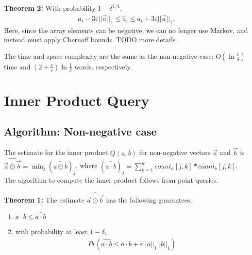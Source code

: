 \documentclass[11pt]{article}
\begin{document}
\textbf{Theorem 2:} With probability $1 - \delta^{1/4}$,
\begin{align}
    a_i - 3\varepsilon||\vec{a}||_1 \leq \hat{a}_i \leq a_i + 3\varepsilon||\vec{a}||_1. 
\end{align}
Here, since the array elements can be negative, we can no longer use Markov, and instead must apply Chernoff
bounds. TODO more details

The time and space complexity are the same as the non-negative case: $O(\ln
\frac{1}{\delta})$ time and $(2 + \frac{e}{\varepsilon})\ln \frac{1}{\delta}$
words, respectively. {

\section{Inner Product Query}
	\subsection{Algorithm: Non-negative case}
		The estimate for the inner product $\mathit{Q}(a,b)$ for non-negative vectors $\vec{a}$ and $\vec{b}$ is $\widehat{\vec{a} \odot \vec{b}} = \min_j(\widehat{a \odot b})_j$, where $(\widehat{a \cdot b})_j = \sum_{k=1}^w count_a[j,k] * count_b[j,k]$. The algorithm to compute the inner product follows from point queries.

        \textbf{Theorem 1:} The estimate $\widehat{\vec{a} \odot \vec{b}}$ has the following guarantees:
        \begin{enumerate}[label=\textnormal{(\arabic*)}]
            \item $a \cdot b \leq \widehat{a \cdot b}$
            \item with probability at least $1 - \delta$, 
            \begin{align}
		        Pr(\widehat{a \cdot b} \leq a \cdot b + \varepsilon||a||_1||b||_1)
            \end{align}
        \end{enumerate}

}
\end{document}
